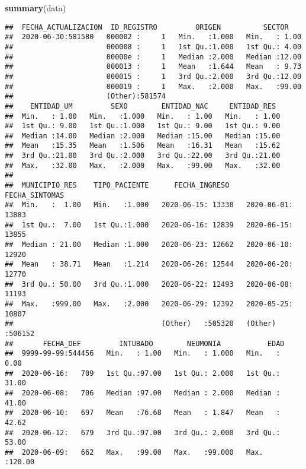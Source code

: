 \documentclass[]{article}
\newenvironment{Shaded}{\begin{snugshade}}{\end{snugshade}}
\newcommand{\KeywordTok}[1]{\textcolor[rgb]{0.13,0.29,0.53}{\textbf{#1}}}
\newcommand{\NormalTok}[1]{#1}
\begin{document}
\begin{Shaded}
\begin{Highlighting}[]
\KeywordTok{summary}\NormalTok{(data)}
\end{Highlighting}
\end{Shaded}

\begin{verbatim}
##  FECHA_ACTUALIZACION  ID_REGISTRO         ORIGEN          SECTOR     
##  2020-06-30:581580   000002 :     1   Min.   :1.000   Min.   : 1.00  
##                      000008 :     1   1st Qu.:1.000   1st Qu.: 4.00  
##                      00000e :     1   Median :2.000   Median :12.00  
##                      000013 :     1   Mean   :1.644   Mean   : 9.73  
##                      000015 :     1   3rd Qu.:2.000   3rd Qu.:12.00  
##                      000019 :     1   Max.   :2.000   Max.   :99.00  
##                      (Other):581574                                  
##    ENTIDAD_UM         SEXO        ENTIDAD_NAC     ENTIDAD_RES   
##  Min.   : 1.00   Min.   :1.000   Min.   : 1.00   Min.   : 1.00  
##  1st Qu.: 9.00   1st Qu.:1.000   1st Qu.: 9.00   1st Qu.: 9.00  
##  Median :14.00   Median :2.000   Median :15.00   Median :15.00  
##  Mean   :15.35   Mean   :1.506   Mean   :16.31   Mean   :15.62  
##  3rd Qu.:21.00   3rd Qu.:2.000   3rd Qu.:22.00   3rd Qu.:21.00  
##  Max.   :32.00   Max.   :2.000   Max.   :99.00   Max.   :32.00  
##                                                                 
##  MUNICIPIO_RES    TIPO_PACIENTE      FECHA_INGRESO       FECHA_SINTOMAS  
##  Min.   :  1.00   Min.   :1.000   2020-06-15: 13330   2020-06-01: 13883  
##  1st Qu.:  7.00   1st Qu.:1.000   2020-06-16: 12839   2020-06-15: 13855  
##  Median : 21.00   Median :1.000   2020-06-23: 12662   2020-06-10: 12920  
##  Mean   : 38.71   Mean   :1.214   2020-06-26: 12544   2020-06-20: 12770  
##  3rd Qu.: 50.00   3rd Qu.:1.000   2020-06-22: 12493   2020-06-08: 11193  
##  Max.   :999.00   Max.   :2.000   2020-06-29: 12392   2020-05-25: 10807  
##                                   (Other)   :505320   (Other)   :506152  
##       FECHA_DEF         INTUBADO        NEUMONIA           EDAD       
##  9999-99-99:544456   Min.   : 1.00   Min.   : 1.000   Min.   :  0.00  
##  2020-06-16:   709   1st Qu.:97.00   1st Qu.: 2.000   1st Qu.: 31.00  
##  2020-06-08:   706   Median :97.00   Median : 2.000   Median : 41.00  
##  2020-06-10:   697   Mean   :76.68   Mean   : 1.847   Mean   : 42.62  
##  2020-06-12:   679   3rd Qu.:97.00   3rd Qu.: 2.000   3rd Qu.: 53.00  
##  2020-06-09:   662   Max.   :99.00   Max.   :99.000   Max.   :120.00  

\end{verbatim}
\end{document}
